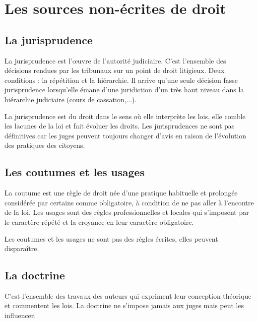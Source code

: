 \documentclass[11pt]{article}
\begin{document}
	\section{Les sources non-écrites de droit}
		\subsection{La jurisprudence}
			La jurisprudence est l'œuvre de l'autorité judiciaire. C'est l'ensemble des décisions rendues par les tribunaux sur un point de droit litigieux. Deux conditions : la répétition et la hiérarchie. Il arrive qu'une seule décision fasse jurisprudence lorsqu'elle émane d'une juridiction d'un très haut niveau dans la hiérarchie judiciaire (cours de cassation,...).
			
			La jurisprudence est du droit dans le sens où elle interprète les lois, elle comble les lacunes de la loi et fait évoluer les droits. Les jurisprudences ne sont pas définitives car les juges peuvent toujours changer d'avis en raison de l'évolution des pratiques des citoyens.
			
		\subsection{Les coutumes et les usages}
			La coutume est une règle de droit née d'une pratique habituelle et prolongée considérée par certains comme obligatoire, à condition de ne pas aller à l'encontre de la loi. Les usages sont des règles professionnelles et locales qui s'imposent par le caractère répété et la croyance en leur caractère obligatoire.
			
			Les coutumes et les usages ne sont pas des règles écrites, elles peuvent disparaître.
			
		\subsection{La doctrine}
			C'est l'ensemble des travaux des auteurs qui expriment leur conception théorique et commentent les lois. La doctrine ne s'impose jamais aux juges mais peut les influencer.
			
\end{document}
